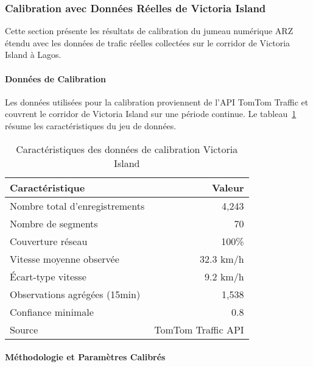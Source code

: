 \subsubsection{Calibration avec Données Réelles de Victoria Island}
\label{subsec:calibration_victoria_island}

Cette section présente les résultats de calibration du jumeau numérique ARZ étendu
avec les données de trafic réelles collectées sur le corridor de Victoria Island à Lagos.

\paragraph{Données de Calibration}

Les données utilisées pour la calibration proviennent de l'API TomTom Traffic et couvrent
le corridor de Victoria Island sur une période continue. Le tableau~\ref{tab:data_quality_74}
résume les caractéristiques du jeu de données.

\begin{table}[h]
    \centering
    \caption{Caractéristiques des données de calibration Victoria Island}
    \label{tab:data_quality_74}
    \begin{tabular}{|l|r|}
        \hline
        \textbf{Caractéristique}       & \textbf{Valeur}    \\
        \hline
        Nombre total d'enregistrements & 4,243              \\
        Nombre de segments             & 70                 \\
        Couverture réseau              & 100\%              \\
        Vitesse moyenne observée       & 32.3 km/h          \\
        Écart-type vitesse             & 9.2 km/h           \\
        Observations agrégées (15min)  & 1,538              \\
        Confiance minimale             & 0.8                \\
        Source                         & TomTom Traffic API \\
        \hline
    \end{tabular}
\end{table}

\paragraph{Méthodologie et Paramètres Calibrés}

